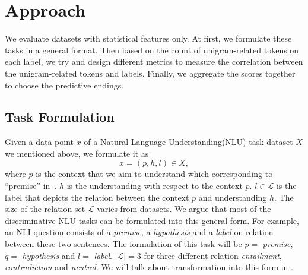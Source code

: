 \section{Approach}
\label{sec:approach}
We evaluate datasets with statistical features only. At first, we formulate  
these tasks in a general format. Then based on the count of unigram-related tokens
on each label, we try and design different metrics to 
measure the correlation between the unigram-related tokens
and labels. Finally, we aggregate the scores together to choose the predictive endings.


\subsection{Task Formulation}

Given a data point $x$ of a Natural Language Understanding(NLU) task dataset $X$ we mentioned above, we formulate it as
\begin{equation}
    x = (p, h, l) \in X,
\end{equation}
\noindent
where $p$ is the context 
that we aim to understand which corresponding to ``premise'' in~.
$h$ is the understanding with respect to the context $p$. $l \in \mathcal{L}$ is the label that depicts the relation between the context $p$ and understanding $h$. 
The size of the relation set $\mathcal{L}$ varies from datasets. We argue that 
most of the discriminative NLU tasks can be formulated into this general form. 
For example, an NLI question consists of a \textit{premise}, a \textit{hypothesis} 
and a \textit{label} on relation between these two sentences. 
The formulation of this task will be $p =$ \textit{premise}, $q =$ \textit{hypothesis} and $l =$ \textit{label}. $|\mathcal{L}| = 3$ for three different 
relation \textit{entailment}, \textit{contradiction} and \textit{neutral}. 
We will talk about transformation into this form in . 


